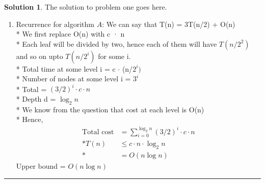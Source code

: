 \documentclass{article}
\theoremstyle{definition}
\def\fline{\rule{0.75\linewidth}{0.5pt}}
\newcommand{\finishline}{\vspace{-15pt}\begin{center}\fline\end{center}}
\newtheorem*{solution*}{Solution}
\newenvironment{solution}{\begin{solution*}}{{\finishline} \end{solution*}}
\begin{document}
\begin{solution}
	The solution to problem one goes here. 
	\begin{enumerate}[label=(\Alph*)]
		

		\item Recurrence for algorithm $A$:  
		We can say that T(n) = 3T(n/2) + O(n)\\*
		We first replace O(n) with c · n  \\*
		Each leaf will be divided by two, hence each of them will have $T(n/2^{2})$ and so on upto $T(n/2^{i})$ for some i. \\*
		Total time at some level i = c $\cdot$ (n/$2^{i})$ \\*
		Number of nodes at some level i = $3^{i}$\\*
		Total = $(3/2)^{i}\cdot c\cdot n$\\*
		Depth d = $\log_2 n$ \\*
		We know from the question that cost at each level is O(n) \\*
		Hence, 
		 \begin{align*}
			{\text{Total cost}} &=  \sum_{i=0}^{\log_2 n} (3/2)^{i}\cdot c\cdot n \\*
			T(n) &\leq c\cdot n\cdot \log_2 n \\*
			&= O(n\log n) 
		 \end{align*}
		Upper bound = $O(n\log n)$
		

\end{enumerate}
\end{solution}
\end{document}
